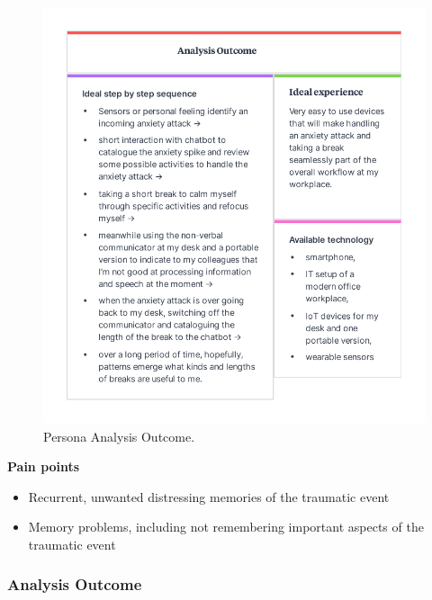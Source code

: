 \begin{figure}[hbt!] 
  \centering
  \includegraphics[width=1.05\linewidth]{chap3/image/persona_jans2.pdf}
  \caption[Persona Analysis outcome ]{Persona Analysis Outcome.}
  \label{fig:Persona_Analysis2}
\end{figure}

\textbf{Pain points}
\begin{itemize}
    \item Recurrent, unwanted distressing memories of the traumatic event
    \item Memory problems, including not remembering important aspects of the traumatic event
\end{itemize}

\subsubsection{Analysis Outcome}

